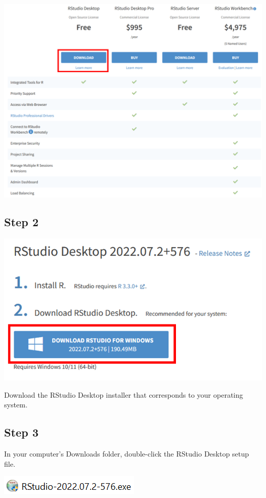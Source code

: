 \documentclass[
  letterpaper,
  DIV=11,
  numbers=noendperiod,
  oneside]{scrreprt}
\begin{document}
\includegraphics{images/paste-3C3D0718.png}

\subsection{Step 2}

\includegraphics{images/paste-027BCBD8.png}

Download the RStudio Desktop installer that corresponds to your
operating system.

\subsection{Step 3}

In your computer's Downloads folder, double-click the RStudio Desktop
setup file.

\includegraphics{images/paste-31A16011.png}
\end{document}
